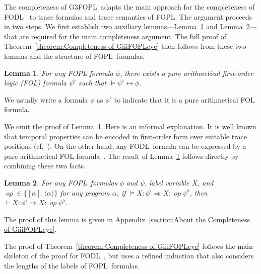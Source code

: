 \documentclass[manuscript,screen]{acmart}
\newtheorem{lemma}{Lemma}[section]
\newcommand{\la}[0]{\langle}
\newcommand{\ra}[0]{\rangle}
\newcommand{\GiiiFOPLcyc}[0]{\mbox{G3FOPL}}
\DeclareMathOperator{\op}{\mathit{op}}
\newcommand{\FOPL}[0]{\mbox{FOPL}}
\newcommand{\FODL}[0]{\mbox{FODL}}
\begin{document}
The completeness of \GiiiFOPLcyc\ adapts the main approach for the completeness of \FODL~\cite{Harel79,Harel00} to trace formulas and trace semantics of \FOPL.  The argument proceeds in two steps.  We first establish two auxiliary lemmas---Lemma~\ref{lemma:completeness lemma 1} and Lemma~\ref{lemma:completeness lemma 2}---that are required for the main completeness argument.  The full proof of Theorem~\ref{theorem:Completeness of GiiiFOPLcyc} then follows from these two lemmas and the structure of \FOPL\ formulas. 


\begin{lemma}
\label{lemma:completeness lemma 1}
    For any FOPL formula $\phi$, there exists a pure arithmetical first-order logic (FOL) formula $\psi^\flat$ such that $\models \psi^\flat \leftrightarrow \phi$.
\end{lemma}

We usually write a formula $\phi$ as $\phi^\flat$ to indicate that it is a pure arithmetical FOL formula. 

We omit the proof of Lemma~\ref{lemma:completeness lemma 1}. 
Here is an informal explanation. 
It is well known that temporal properties can be encoded in first-order form over suitable trace positions (cf.~\cite{TemporalLogic}). 
On the other hand, any \FODL\ formula can be expressed by a pure arithmetical FOL formula~\cite{Harel79,Harel00}. 
The result of Lemma~\ref{lemma:completeness lemma 1} follows directly by combining these two facts. 


\begin{lemma}
\label{lemma:completeness lemma 2}
For any \FOPL\ formulas $\phi$ and $\psi$, label variable $X$, and $\op\in \{[\alpha], \la\alpha\ra\}$ for any program $\alpha$, if $\models X : \phi^\flat\Rightarrow X : \op\psi^\flat$, then $\vdash X : \phi^\flat\Rightarrow X : \op\psi^\flat$. 
\end{lemma}

The proof of this lemma is given in Appendix~\ref{section:About the Completeness of GiiiFOPLcyc}. 


The proof of Theorem~\ref{theorem:Completeness of GiiiFOPLcyc} follows the main skeleton of the proof for \FODL~\cite{Harel79}, but uses a refined induction that also considers the lengths of the labels of \FOPL\ formulas. 
\end{document}
